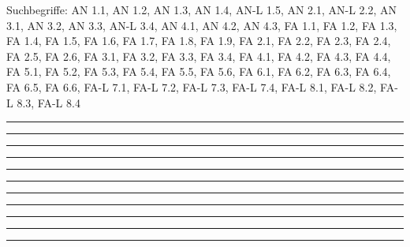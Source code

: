 \documentclass[a4paper,12pt]{report}
\begin{document}

 \scriptsize Suchbegriffe: AN 1.1, AN 1.2, AN 1.3, AN 1.4, AN-L 1.5, AN 2.1, AN-L 2.2, AN 3.1, AN 3.2, AN 3.3, AN-L 3.4, AN 4.1, AN 4.2, AN 4.3, FA 1.1, FA 1.2, FA 1.3, FA 1.4, FA 1.5, FA 1.6, FA 1.7, FA 1.8, FA 1.9, FA 2.1, FA 2.2, FA 2.3, FA 2.4, FA 2.5, FA 2.6, FA 3.1, FA 3.2, FA 3.3, FA 3.4, FA 4.1, FA 4.2, FA 4.3, FA 4.4, FA 5.1, FA 5.2, FA 5.3, FA 5.4, FA 5.5, FA 5.6, FA 6.1, FA 6.2, FA 6.3, FA 6.4, FA 6.5, FA 6.6, FA-L 7.1, FA-L 7.2, FA-L 7.3, FA-L 7.4, FA-L 8.1, FA-L 8.2, FA-L 8.3, FA-L 8.4\normalsize 
 
%
\hrule  \leer

%
\hrule  \leer

%
\hrule  \leer

%
\hrule  \leer

%
\hrule  \leer

%
\hrule  \leer

%
\hrule  \leer

%
\hrule  \leer

%
\hrule  \leer

%
\hrule  \leer

%
\hrule  \leer
\end{document}

